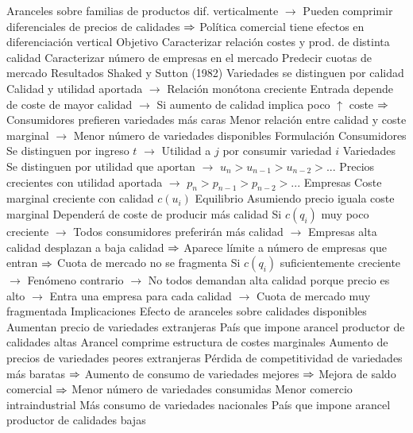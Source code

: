 \documentclass{nuevotema}
\begin{document}
\begin{esquemal}
				\4[] Aranceles sobre familias de productos dif. verticalmente
				\4[] $\to$ Pueden comprimir diferenciales de precios de calidades
				\4[] $\then$ Política comercial tiene efectos en diferenciación vertical
				\4 Objetivo
				\4[] Caracterizar relación costes y prod. de distinta calidad
				\4[] Caracterizar número de empresas en el mercado
				\4[] Predecir cuotas de mercado
				\4 Resultados
				\4[] Shaked y Sutton (1982)
				\4[] Variedades se distinguen por calidad
				\4[] Calidad y utilidad aportada
				\4[] $\to$ Relación monótona creciente
				\4[] Entrada depende de coste de mayor calidad
				\4[] $\to$ Si aumento de calidad implica poco $\uparrow$ coste
				\4[] $\then$ Consumidores prefieren variedades más caras
				\4[] Menor relación entre calidad y coste marginal
				\4[] $\to$ Menor número de variedades disponibles
			\3 Formulación
				\4 Consumidores
				\4[] Se distinguen por ingreso $t$
				\4[] 
				\4[] $\to$ Utilidad a $j$ por consumir variedad $i$
				\4 Variedades
				\4[] Se distinguen por utilidad que aportan
				\4[] $\to$ $u_n > u_{n-1} > u_{n-2} > ...$
				\4[] Precios crecientes con utilidad aportada
				\4[] $\to$ $p_n > p_{n-1} > p_{n-2} > ...$
				\4 Empresas
				\4[] Coste marginal creciente con calidad $c(u_i)$
				\4 Equilibrio
				\4[] Asumiendo precio iguala coste marginal
				\4[] Dependerá de coste de producir más calidad
				\4[] Si $c(q_i)$ muy poco creciente
				\4[] $\to$ Todos consumidores preferirán más calidad
				\4[] $\to$ Empresas alta calidad desplazan a baja calidad
				\4[] $\then$ Aparece límite a número de empresas que entran
				\4[] $\then$ Cuota de mercado no se fragmenta
				\4[] Si $c(q_i)$ suficientemente creciente
				\4[] $\to$ Fenómeno contrario
				\4[] $\to$ No todos demandan alta calidad porque precio es alto
				\4[] $\to$ Entra una empresa para cada calidad
				\4[] $\to$ Cuota de mercado muy fragmentada
			\3 Implicaciones
				\4 Efecto de aranceles sobre calidades disponibles
				\4[] Aumentan precio de variedades extranjeras
				\4 País que impone arancel productor de calidades altas
				\4[] Arancel comprime estructura de costes marginales
				\4[] Aumento de precios de variedades peores extranjeras
				\4[] Pérdida de competitividad de variedades más baratas
				\4[] $\then$ Aumento de consumo de variedades mejores
				\4[] $\then$ Mejora de saldo comercial
				\4[] $\then$ Menor número de variedades consumidas
				\4[$\then$] Menor comercio intraindustrial
				\4[$\then$] Más consumo de variedades nacionales
				\4 País que impone arancel productor de calidades bajas

\end{esquemal}
\end{document}
